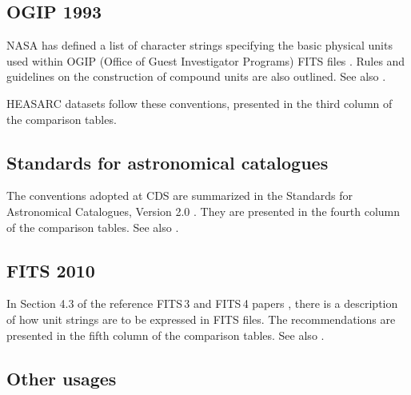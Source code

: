 \documentclass[11pt,a4paper]{ivoa}
\begin{document}
\subsection{OGIP 1993}

NASA has defined a list of character strings specifying the basic physical units
used within OGIP (Office of Guest Investigator Programs) FITS files
\citep{george95}. Rules and guidelines on the construction of compound
units are also outlined.  See also .

HEASARC datasets follow these conventions, presented in the third column
of the comparison tables.

\subsection{Standards for astronomical catalogues}

The conventions adopted at CDS are summarized in the Standards for Astronomical
Catalogues, Version 2.0 \citep[\S3.2]{cds00}. They are presented in the fourth column
of the comparison tables.  See also .

\subsection{FITS 2010}

In Section 4.3 of the reference FITS\,3 and FITS\,4 papers
\citep{pence10,fits4}, there is a description of
how unit strings are to be expressed in FITS files. The
recommendations are presented in the fifth column of the comparison
tables.  See also .

\subsection{Other usages}
\end{document}
